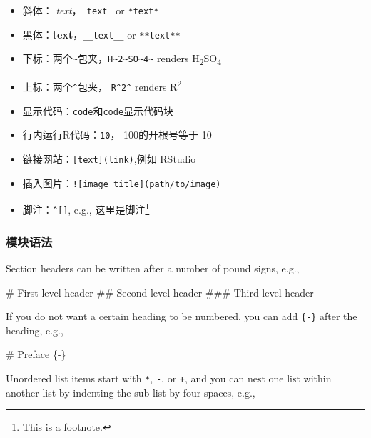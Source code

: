 \documentclass[]{article}
\newenvironment{Shaded}{\begin{snugshade}}{\end{snugshade}}
\newcommand{\FunctionTok}[1]{\textcolor[rgb]{0.00,0.00,0.00}{#1}}
\providecommand{\tightlist}{%
  \setlength{\itemsep}{0pt}\setlength{\parskip}{0pt}}
\begin{document}
\begin{itemize}
\tightlist
\item
  斜体： \emph{text}，\texttt{\_text\_} or \texttt{*text*}
\item
  黑体：\textbf{text}，\texttt{\_\_text\_\_} or \texttt{**text**}
\item
  下标：两个\texttt{\textasciitilde{}}包夹，\texttt{H\textasciitilde{}2\textasciitilde{}SO\textasciitilde{}4\textasciitilde{}}
  renders H\textsubscript{2}SO\textsubscript{4}
\item
  上标：两个\texttt{\^{}}包夹， \texttt{R\^{}2\^{}} renders
  R\textsuperscript{2}
\item
  显示代码：\texttt{code}和\texttt{code}显示代码块
\item
  行内运行R代码：\texttt{10}， 100的开根号等于 10
\item
  链接网站：\texttt{{[}text{]}(link)},例如
  \href{https://www.rstudio.com}{RStudio}
\item
  插入图片：\texttt{!{[}image\ title{]}(path/to/image)}
\item
  脚注：\texttt{\^{}{[}{]}}, e.g., 这里是脚注\footnote{This is a
    footnote.}
\end{itemize}

\subsubsection{模块语法}

Section headers can be written after a number of pound signs, e.g.,

\begin{Shaded}
\begin{Highlighting}[]
\FunctionTok{# First-level header}
\FunctionTok{## Second-level header}
\FunctionTok{### Third-level header}
\end{Highlighting}
\end{Shaded}

If you do not want a certain heading to be numbered, you can add
\texttt{\{-\}} after the heading, e.g.,

\begin{Shaded}
\begin{Highlighting}[]
\FunctionTok{# Preface \{-\}}
\end{Highlighting}
\end{Shaded}

Unordered list items start with \texttt{*}, \texttt{-}, or \texttt{+},
and you can nest one list within another list by indenting the sub-list
by four spaces, e.g.,
\end{document}
